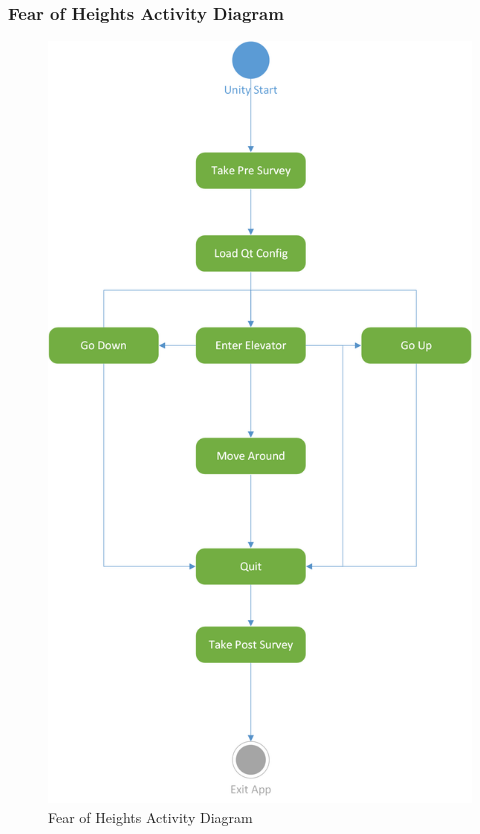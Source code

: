 \documentclass[a4paper,10pt]{article}
\begin{document}
\subsubsection{Fear of Heights Activity Diagram}
\begin{figure}[H]
					\centerline{\includegraphics[scale = 0.6]{fohActivityDiag.png}}
					\caption{Fear of Heights Activity Diagram}
					\label{fig:fohAct}
				\end{figure}
\end{document}
